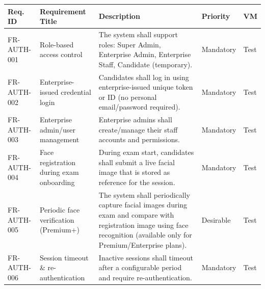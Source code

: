 \captionsetup{hypcap=false}
\label{tab:auth-requirements}
\begin{tabularx}{\linewidth}{|l|>{\raggedright\arraybackslash}p{4.5cm}|>{\raggedright\arraybackslash}X|l|l|}
\hline
\textbf{Req. ID} & \textbf{Requirement Title} & \textbf{Description} & \textbf{Priority} & \textbf{VM} \\ \hline
FR-AUTH-001 & Role-based access control & The system shall support roles: Super Admin, Enterprise Admin, Enterprise Staff, Candidate (temporary). & Mandatory & Test \\ \hline
FR-AUTH-002 & Enterprise-issued credential login & Candidates shall log in using enterprise-issued unique token or ID (no personal email/password required). & Mandatory & Test \\ \hline
FR-AUTH-003 & Enterprise admin/user management & Enterprise admins shall create/manage their staff accounts and permissions. & Mandatory & Test \\ \hline
FR-AUTH-004 & Face registration during exam onboarding & During exam start, candidates shall submit a live facial image that is stored as reference for the session. & Mandatory & Test \\ \hline
FR-AUTH-005 & Periodic face verification (Premium+) & The system shall periodically capture facial images during exam and compare with registration image using face recognition (available only for Premium/Enterprise plans). & Desirable & Test \\ \hline
FR-AUTH-006 & Session timeout \& re-authentication & Inactive sessions shall timeout after a configurable period and require re-authentication. & Mandatory & Test \\ \hline
\end{tabularx}

\vspace{3em}

